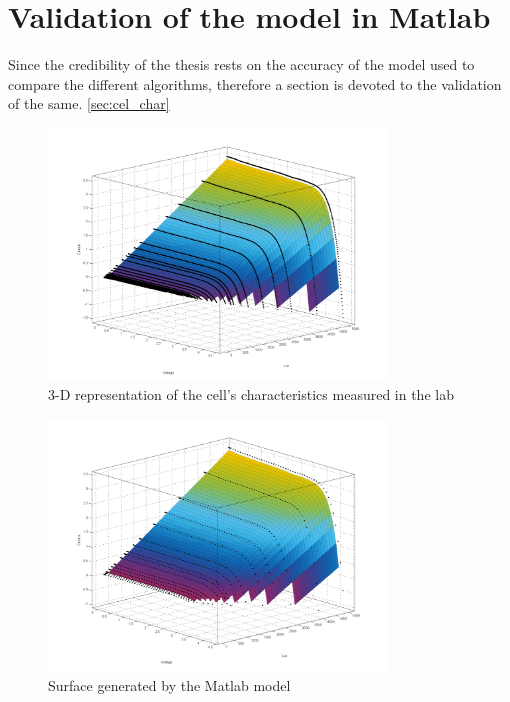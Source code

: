 \section {Validation of the model in Matlab{\textregistered}}\label{sec:Validation} 

Since the credibility of the thesis rests on the accuracy of the model used to compare the different algorithms, therefore a section is devoted to the validation of the same. \ref{sec:cel_char}


\begin{figure}[H]
	  \begin{center}
		  \includegraphics[width=0.8\textwidth]{images/IVLUX_LAB_measured}
		  \caption{3-D representation of the cell's characteristics measured in the lab }
		  \label{fig:IVLUX_LAB_measured}
	  \end{center}
  \end{figure}

\begin{figure}[H]
  \begin{center}
	  \includegraphics[width=0.8\textwidth]{images/IVLUX_MOD_gen}
	  \caption{Surface generated by the Matlab model}
	  \label{fig:IVLUX_MOD_gen}
  \end{center}
\end{figure}

